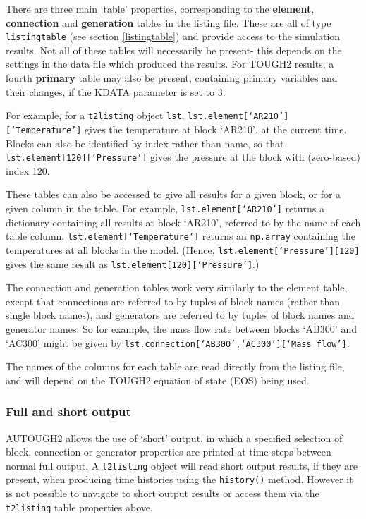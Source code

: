 There are three main `table' properties, corresponding to the \textbf{element}, \textbf{connection} and \textbf{generation} tables in the listing file.  These are all of type \texttt{listingtable} (see section \ref{listingtable}) and provide access to the simulation results.  Not all of these tables will necessarily be present- this depends on the settings in the data file which produced the results.  For TOUGH2 results, a fourth \textbf{primary} table may also be present, containing primary variables and their changes, if the KDATA parameter is set to 3.

For example, for a \texttt{t2listing} object \texttt{lst}, \texttt{lst.element[`AR210'][`Temperature']} gives the temperature at block `AR210', at the current time.  Blocks can also be identified by index rather than name, so that \texttt{lst.element[120][`Pressure']} gives the pressure at the block with (zero-based) index 120.

These tables can also be accessed to give all results for a given block, or for a given column in the table.  For example, \texttt{lst.element[`AR210']} returns a dictionary containing all results at block `AR210', referred to by the name of each table column.  \texttt{lst.element[`Temperature']} returns an \texttt{np.array} containing the temperatures at all blocks in the model.  (Hence, \texttt{lst.element[`Pressure'][120]} gives the same result as \texttt{lst.element[120][`Pressure']}.)

The connection and generation tables work very similarly to the element table, except that connections are referred to by tuples of block names (rather than single block names), and generators are referred to by tuples of block names and generator names.  So for example, the mass flow rate between blocks `AB300' and `AC300' might be given by \texttt{lst.connection[`AB300',`AC300'][`Mass flow']}.

The names of the columns for each table are read directly from the listing file, and will depend on the TOUGH2 equation of state (EOS) being used.

\subsubsection{Full and short output}

AUTOUGH2 allows the use of `short' output, in which a specified selection of block, connection or generator properties are printed at time steps between normal full output.  A \texttt{t2listing} object will read short output results, if they are present, when producing time histories using the \texttt{history()} method.  However it is not possible to navigate to short output results or access them via the \texttt{t2listing} table properties above.

